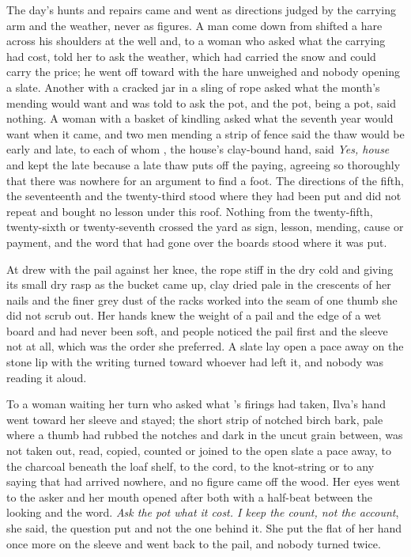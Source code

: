 The day's hunts and repairs came and went as directions judged by the carrying arm and the weather, never as figures. A man come down from  shifted a hare across his shoulders at the well and, to a woman who asked what the carrying had cost, told her to ask the weather, which had carried the snow and could carry the price; he went off toward  with the hare unweighed and nobody opening a slate. Another with a cracked jar in a sling of rope asked what the month's mending would want and was told to ask the pot, and the pot, being a pot, said nothing. A woman with a basket of kindling asked what the seventh year would want when it came, and two men mending a strip of fence said the thaw would be early and late, to each of whom , the house's clay-bound hand, said \emph{Yes, house} and kept the late because a late thaw puts off the paying, agreeing so thoroughly that there was nowhere for an argument to find a foot. The directions of the fifth, the seventeenth and the twenty-third stood where they had been put and did not repeat and bought no lesson under this roof. Nothing from the twenty-fifth, twenty-sixth or twenty-seventh crossed the yard as sign, lesson, mending, cause or payment, and the word that had gone over the boards stood where it was put.

\scenebreak

At   drew with the pail against her knee, the rope stiff in the dry cold and giving its small dry rasp as the bucket came up, clay dried pale in the crescents of her nails and the finer grey dust of the racks worked into the seam of one thumb she did not scrub out. Her hands knew the weight of a pail and the edge of a wet board and had never been soft, and people noticed the pail first and the sleeve not at all, which was the order she preferred. A slate lay open a pace away on the stone lip with the writing turned toward whoever had left it, and nobody was reading it aloud.

To a woman waiting her turn who asked what 's firings had taken, Ilva's hand went toward her sleeve and stayed; the short strip of notched birch bark, pale where a thumb had rubbed the notches and dark in the uncut grain between, was not taken out, read, copied, counted or joined to the open slate a pace away, to the charcoal beneath the loaf shelf, to the cord, to the knot-string or to any saying that had arrived nowhere, and no figure came off the wood. Her eyes went to the asker and her mouth opened after both with a half-beat between the looking and the word. \emph{Ask the pot what it cost. I keep the count, not the account}, she said, the question put and not the one behind it. She put the flat of her hand once more on the sleeve and went back to the pail, and nobody turned twice.

